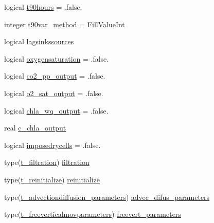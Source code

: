\begin{DoxyCompactItemize}
\item 
logical \mbox{\hyperlink{structmodulewaterproperties_1_1t__evolution_a0db629dad6deb4170937bed7e554fa79}{t90hours}} = .false.
\item 
integer \mbox{\hyperlink{structmodulewaterproperties_1_1t__evolution_ad96cbc7addbde948054714f91f24f3c3}{t90var\+\_\+method}} = Fill\+Value\+Int
\item 
logical \mbox{\hyperlink{structmodulewaterproperties_1_1t__evolution_acbdb23b9274af5351b83d6a0c0da1ddb}{lagsinkssources}}
\item 
logical \mbox{\hyperlink{structmodulewaterproperties_1_1t__evolution_a7f7dfea69d78b51af5d56da76c598670}{oxygensaturation}} = .false.
\item 
logical \mbox{\hyperlink{structmodulewaterproperties_1_1t__evolution_a7876c4cccfee0bb1f6b230d714e8dee9}{co2\+\_\+pp\+\_\+output}} = .false.
\item 
logical \mbox{\hyperlink{structmodulewaterproperties_1_1t__evolution_a10d48b29159ff0f246656d67de2a1eb6}{o2\+\_\+sat\+\_\+output}} = .false.
\item 
logical \mbox{\hyperlink{structmodulewaterproperties_1_1t__evolution_a87bcb5dc77d27a72f5ab13ab4cdab157}{chla\+\_\+wq\+\_\+output}} = .false.
\item 
real \mbox{\hyperlink{structmodulewaterproperties_1_1t__evolution_a8681572fb0a771b1637f79166d8bd9fe}{c\+\_\+chla\+\_\+output}}
\item 
logical \mbox{\hyperlink{structmodulewaterproperties_1_1t__evolution_a04a6101511df88e352b1a8de102e4d28}{imposedrycells}} = .false.
\item 
type(\mbox{\hyperlink{structmodulewaterproperties_1_1t__filtration}{t\+\_\+filtration}}) \mbox{\hyperlink{structmodulewaterproperties_1_1t__evolution_a4763094568a6605b0b220daa2cac2c56}{filtration}}
\item 
type(\mbox{\hyperlink{structmodulewaterproperties_1_1t__reinitialize}{t\+\_\+reinitialize}}) \mbox{\hyperlink{structmodulewaterproperties_1_1t__evolution_a93c402b9d3885326faa565f1c4b222e7}{reinitialize}}
\item 
type(\mbox{\hyperlink{structmodulewaterproperties_1_1t__advectiondiffusion__parameters}{t\+\_\+advectiondiffusion\+\_\+parameters}}) \mbox{\hyperlink{structmodulewaterproperties_1_1t__evolution_a4c1754ec8dbf9fd974b278d4c9677615}{advec\+\_\+difus\+\_\+parameters}}
\item 
type(\mbox{\hyperlink{structmodulewaterproperties_1_1t__freeverticalmovparameters}{t\+\_\+freeverticalmovparameters}}) \mbox{\hyperlink{structmodulewaterproperties_1_1t__evolution_a035d1de03b0315406183b25731b15035}{freevert\+\_\+parameters}}

\end{DoxyCompactItemize}
